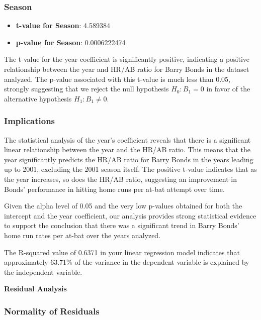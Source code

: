\documentclass[
]{article}
\providecommand{\tightlist}{%
  \setlength{\itemsep}{0pt}\setlength{\parskip}{0pt}}
\begin{document}
\subsubsection{Season}\label{season}

\begin{itemize}
\tightlist
\item
  \textbf{t-value for Season}: 4.589384
\item
  \textbf{p-value for Season}: 0.0006222474
\end{itemize}

The t-value for the year coefficient is significantly positive,
indicating a positive relationship between the year and HR/AB ratio for
Barry Bonds in the dataset analyzed. The p-value associated with this
t-value is much less than 0.05, strongly suggesting that we reject the
null hypothesis \(H_0: B_{1} = 0\) in favor of the alternative
hypothesis \(H_1: B_{1} \neq 0\).

\subsubsection{Implications}\label{implications}

The statistical analysis of the year's coefficient reveals that there is
a significant linear relationship between the year and the HR/AB ratio.
This means that the year significantly predicts the HR/AB ratio for
Barry Bonds in the years leading up to 2001, excluding the 2001 season
itself. The positive t-value indicates that as the year increases, so
does the HR/AB ratio, suggesting an improvement in Bonds' performance in
hitting home runs per at-bat attempt over time.

Given the alpha level of 0.05 and the very low p-values obtained for
both the intercept and the year coefficient, our analysis provides
strong statistical evidence to support the conclusion that there was a
significant trend in Barry Bonds' home run rates per at-bat over the
years analyzed.

The R-squared value of 0.6371 in your linear regression model indicates
that approximately 63.71\% of the variance in the dependent variable is
explained by the independent variable.

\textbf{Residual Analysis}

\subsubsection{Normality of Residuals}\label{normality-of-residuals}
\end{document}

